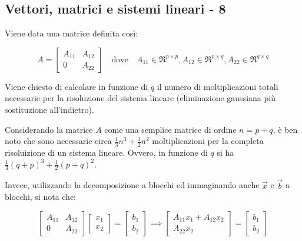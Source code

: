 \documentclass{article}
\begin{document}
\clearpage
\subsection*{Vettori, matrici e sistemi lineari - 8}

Viene data una matrice definita così:

\begin{equation*}
A =
\begin{bmatrix}
	A_{11} & A_{12} \\
	0      & A_{22}
\end{bmatrix}
\quad \textrm{dove} \quad A_{11} \in \Re^{p\times p} ,A_{12} \in \Re^{p\times q} ,A_{22} \in \Re^{q\times q}
\end{equation*}

Viene chiesto di calcolare in funzione di $q$ il numero di moltiplicazioni totali necessarie per la risoluzione del sistema lineare (eliminazione gaussiana più sostituzione all’indietro).

Considerando la matrice $A$ come una semplice matrice di ordine $n=p+q$, è ben noto che sono necessarie circa $\frac{1}{3}n^3 +\frac{1}{2}n^2$ moltiplicazioni per la completa risoluizione di un sistema lineare. Ovvero, in funzione di $q$ si ha $\frac{1}{3}{\left(q+p\right)}^3 +\frac{1}{2}{\left(p+q\right)}^2$.

Invece, utilizzando la decomposizione a blocchi ed immaginando anche $\overrightarrow{x}$ e $\overrightarrow{b}$ a blocchi, si nota che:

\begin{equation*}
	\begin{bmatrix}
	A_{11} & A_{12} \\
	0      & A_{22}
	\end{bmatrix}
	\begin{bmatrix}
	x_1 \\ x_2
	\end{bmatrix}
	=
	\begin{bmatrix}
	b_1 \\ b_2
	\end{bmatrix}
	\implies
	\begin{bmatrix}
	A_{11}x_1 + A_{12}x_2 \\
	A_{22}x_2
	\end{bmatrix}
	=
	\begin{bmatrix}
	b_1 \\ b_2
	\end{bmatrix}
\end{equation*}
\end{document}
